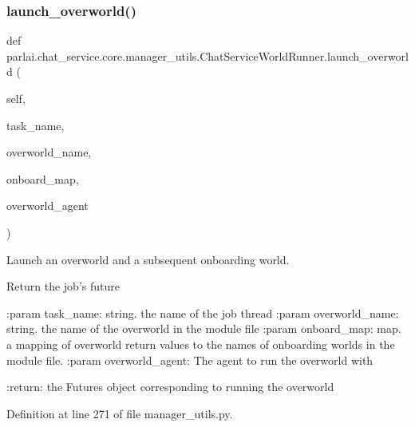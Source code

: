 \subsubsection{\texorpdfstring{launch\+\_\+overworld()}{launch\_overworld()}}
{\footnotesize\ttfamily def parlai.\+chat\+\_\+service.\+core.\+manager\+\_\+utils.\+Chat\+Service\+World\+Runner.\+launch\+\_\+overworld (\begin{DoxyParamCaption}\item[{}]{self,  }\item[{}]{task\+\_\+name,  }\item[{}]{overworld\+\_\+name,  }\item[{}]{onboard\+\_\+map,  }\item[{}]{overworld\+\_\+agent }\end{DoxyParamCaption})}

\begin{DoxyVerb}Launch an overworld and a subsequent onboarding world.

Return the job's future

:param task_name:
    string. the name of the job thread
:param overworld_name:
    string. the name of the overworld in the module file
:param onboard_map:
    map. a mapping of overworld return values to the names
    of onboarding worlds in the module file.
:param overworld_agent:
    The agent to run the overworld with

:return:
    the Futures object corresponding to running the overworld
\end{DoxyVerb}
 

Definition at line 271 of file manager\+\_\+utils.\+py.


